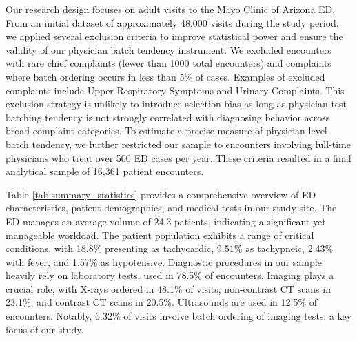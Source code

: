 \documentclass[,,nonblindrev]{informs}
\begin{document}
Our research design focuses on adult visits to the Mayo Clinic of
Arizona ED. From an initial dataset of approximately 48,000 visits
during the study period, we applied several exclusion criteria to
improve statistical power and ensure the validity of our physician batch
tendency instrument. We excluded encounters with rare chief complaints
(fewer than 1000 total encounters) and complaints where batch ordering
occurs in less than 5\% of cases. Examples of excluded complaints
include Upper Respiratory Symptoms and Urinary Complaints. This
exclusion strategy is unlikely to introduce selection bias as long as
physician test batching tendency is not strongly correlated with
diagnosing behavior across broad complaint categories. To estimate a
precise measure of physician-level batch tendency, we further restricted
our sample to encounters involving full-time physicians who treat over
500 ED cases per year. These criteria resulted in a final analytical
sample of 16,361 patient encounters.

Table \ref{tab:summary_statistics} provides a comprehensive overview of
ED characteristics, patient demographics, and medical tests in our study
site. The ED manages an average volume of 24.3 patients, indicating a
significant yet manageable workload. The patient population exhibits a
range of critical conditions, with 18.8\% presenting as tachycardic,
9.51\% as tachypneic, 2.43\% with fever, and 1.57\% as hypotensive.
Diagnostic procedures in our sample heavily rely on laboratory tests,
used in 78.5\% of encounters. Imaging plays a crucial role, with X-rays
ordered in 48.1\% of visits, non-contrast CT scans in 23.1\%, and
contrast CT scans in 20.5\%. Ultrasounds are used in 12.5\% of
encounters. Notably, 6.32\% of visits involve batch ordering of imaging
tests, a key focus of our study.
\end{document}
